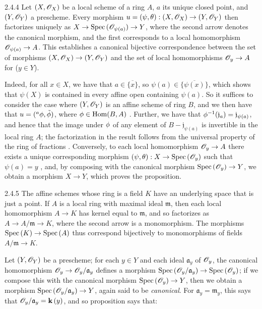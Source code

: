 \begin{envs}[Proposition]{2.4.4}
\label{prop-1.2.4.4}
Let $(X,\mathscr{O}_X)$ be a local scheme of a ring
$A$, $a$ its unique closed point, and $(Y,\mathscr{O}_Y)$ a prescheme. Every morphism
$u=(\psi,\theta):(X,\mathscr{O}_X)\to(Y,\mathscr{O}_Y)$ then factorizes uniquely as
$X\to{\mathop{\mathrm{Spec}}\nolimits}\,(\mathscr{O}_{\psi(a)})\to Y$, where the second arrow denotes the canonical
morphism, and the first corresponds to a local homomorphism $\mathscr{O}_{\psi(a)}\to A$.
This establishes a canonical bijective correspondence between the set of
morphisms $(X,\mathscr{O}_X)\to(Y,\mathscr{O}_Y)$ and the set of local homomorphisms $\mathscr{O}_y\to A$
for ($y\in Y$).
\end{envs}
    
Indeed, for all $x\in X$, we have that $a\in\overline{\{x\}}$, so
$\psi(a)\in\overline{\{\psi(x)\}}$, which shows that $\psi(X)$ is contained in
every affine open containing $\psi(a)$. So it suffices to consider the case
where $(Y,\mathscr{O}_Y)$ is an affine scheme of ring $B$, and we then have that
$u=({}^a\phi,\tilde{\phi})$, where $\phi\in{\mathop{\mathrm{Hom}}\nolimits}(B,A)$ . Further,
we have that $\phi^{-1}(\mathfrak{j}_a)=\mathfrak{j}_{\psi(a)}$, and hence
that the image under $\phi$ of any element of
$B-\mathfrak{j}_{\psi(a)}$ is invertible in the local ring $A$; the
factorization in the result follows from the universal property of the ring of
fractions . Conversely, to each local homomorphism
$\mathscr{O}_y\to A$ there exists a unique corresponding morphism
$(\psi,\theta):X\to{\mathop{\mathrm{Spec}}\nolimits}\,(\mathscr{O}_y)$ such that $\psi(a)=y$ , and,
by composing with the canonical morphism ${\mathop{\mathrm{Spec}}\nolimits}\,(\mathscr{O}_y)\to Y$, we obtain a morphism
$X\to Y$, which proves the proposition.
    
\begin{env}{2.4.5}
\label{env-1.2.4.5}
The affine schemes whose ring is a field $K$ have an
underlying space that is just a point. If $A$ is a local ring with maximal
ideal $\mathfrak{m}$, then each local homomorphism $A\to K$ has kernel equal to
$\mathfrak{m}$, and so factorizes as $A\to A/\mathfrak{m}\to K$, where the
second arrow is a monomorphism. The morphisms ${\mathop{\mathrm{Spec}}\nolimits}\,(K)\to{\mathop{\mathrm{Spec}}\nolimits}\,(A)$ thus
correspond bijectively to monomorphisms of fields $A/\mathfrak{m}\to K$.
\end{env}
    
Let $(Y,\mathscr{O}_Y)$ be a prescheme; for each $y\in Y$ and each ideal
$\mathfrak{a}_y$ of $\mathscr{O}_y$, the canonical homomorphism
$\mathscr{O}_y\to\mathscr{O}_y/\mathfrak{a}_y$ defines a morphism
${\mathop{\mathrm{Spec}}\nolimits}\,(\mathscr{O}_y/\mathfrak{a}_y)\to{\mathop{\mathrm{Spec}}\nolimits}\,(\mathscr{O}_y)$; if we compose this with the
canonical morphism ${\mathop{\mathrm{Spec}}\nolimits}\,(\mathscr{O}_y)\to Y$, then we obtain a morphism
${\mathop{\mathrm{Spec}}\nolimits}\,(\mathscr{O}_y/\mathfrak{a}_y)\to Y$, again said to be \textit{canonical}. For
$\mathfrak{a}_y=\mathfrak{m}_y$, this says that $\mathscr{O}_y/\mathfrak{a}_y=\mathbf{k}\,(y)$, and
so proposition  says that:
    
